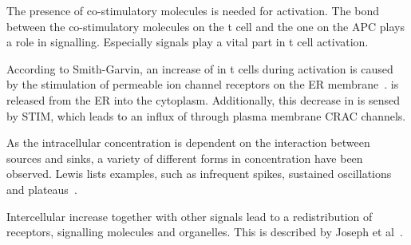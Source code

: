 The presence of co-stimulatory molecules is needed for activation. The bond between the co-stimulatory molecules on the t cell and the one on the APC plays a role in signalling. Especially \Calcium signals play a vital part in t cell activation.

According to Smith-Garvin, an increase of \Calcium in t cells during activation is caused by the stimulation of \Calcium permeable ion channel receptors on the ER membrane~\cite{smith2009}. \Calcium is released from the ER into the cytoplasm. Additionally, this decrease in \Calcium is sensed by STIM, which leads to an influx of \Calcium through plasma membrane CRAC channels.

As the intracellular \Calcium concentration is dependent on the interaction between \Calcium sources and sinks, a variety of different forms in \Calcium concentration have been observed. Lewis lists examples, such as infrequent spikes, sustained oscillations and plateaus~\cite{Lewis2001}.

Intercellular \Calcium increase together with other signals lead to a redistribution of\\ receptors, signalling molecules and organelles. This is described by Joseph et al~\cite{joseph2014}.